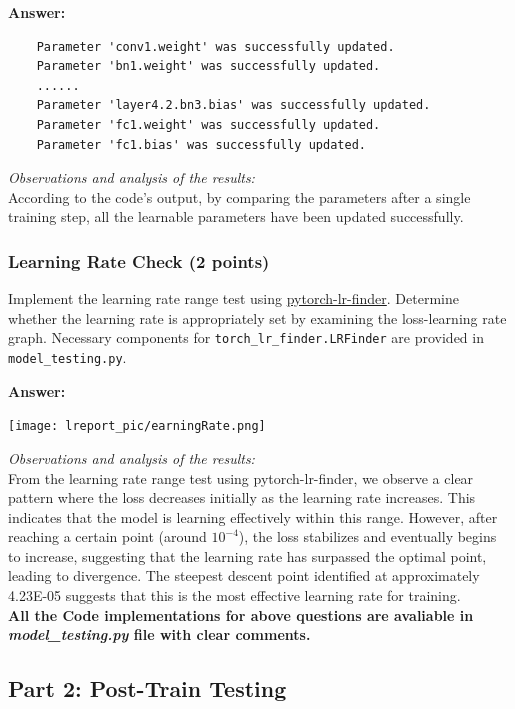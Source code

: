 \documentclass[11pt, oneside]{article}   	%
\begin{document}
\textbf{Answer:}
\begin{verbatim}
    Parameter 'conv1.weight' was successfully updated.
    Parameter 'bn1.weight' was successfully updated.
    ......
    Parameter 'layer4.2.bn3.bias' was successfully updated.
    Parameter 'fc1.weight' was successfully updated.
    Parameter 'fc1.bias' was successfully updated.
\end{verbatim}
\textit{Observations and analysis of the results: }
\\
According to the code's output, by comparing the parameters after a single training step, all the learnable parameters have been updated successfully.

\subsubsection*{Learning Rate Check (2 points)}
Implement the learning rate range test using \href{https://github.com/davidtvs/pytorch-lr-finder#tweaked-version-from-fastaiauto}{pytorch-lr-finder}. Determine whether the learning rate is appropriately set by examining the loss-learning rate graph. Necessary components for \texttt{torch\_lr\_finder.LRFinder} are provided in \texttt{model\_testing.py}.

\textbf{Answer:} \\
\begin{center}
    \texttt{[image: lreport\_pic/earningRate.png]}
\end{center}

\textit{Observations and analysis of the results: }
\\
From the learning rate range test using pytorch-lr-finder, we observe a clear pattern where the loss decreases initially as the learning rate increases. This indicates that the model is learning effectively within this range. However, after reaching a certain point (around $10^{-4}$), the loss stabilizes and eventually begins to increase, suggesting that the learning rate has surpassed the optimal point, leading to divergence. The steepest descent point identified at approximately 4.23E-05 suggests that this is the most effective learning rate for training.
\\
\textbf{All the Code implementations for above questions are avaliable in \textit{model\_testing.py} file with clear comments.}

\subsection*{Part 2: Post-Train Testing}
\end{document}

